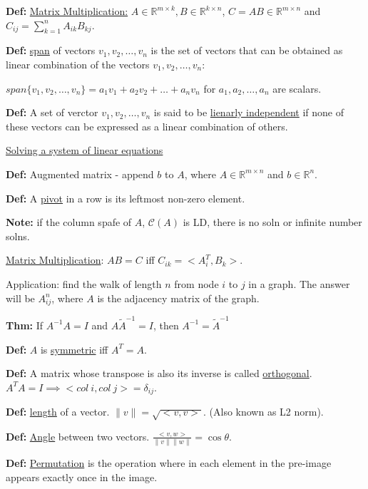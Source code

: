 \documentclass{report}
\begin{document}
\textbf{Def:} \underline{Matrix Multiplication:} $A \in \mathbb{R}^{m \times k}, B \in \mathbb{R}^{k \times n}$,
$C = AB \in \mathbb{R}^{m \times n}$ and $C_{ij} = \sum_{k=1}^{n} A_{ik}B_{kj}$.

\textbf{Def:} \underline{span} of vectors $v_1, v_2, \dots, v_n$ is the set of vectors that can be obtained as
linear combination of the vectors $v_1, v_2, \dots, v_n$:

$span\{v_1, v_2, \dots, v_n\} = a_1v_1 + a_2v_2 + \dots + a_nv_n$ for $a_1, a_2, \dots, a_n$ are scalars.

\textbf{Def:} A set of verctor $v_1, v_2, \dots, v_n$ is said to be \underline{lienarly
    independent} if none of these vectors can be expressed as a linear combination
of others.

\vspace{2mm}
\underline{Solving a system of linear equations}

\textbf{Def:} Augmented matrix - append $b$ to $A$, where $A \in
    \mathbb{R}^{m \times n}$ and $b \in \mathbb{R}^{n}$.

\textbf{Def:} A \underline{pivot} in a row is its leftmost non-zero element.

\textbf{Note:} if the column spafe of $A$, $\mathcal{C}(A)$ is LD,
there is no soln or infinite number solns.

\underline{Matrix Multiplication}: $AB = C$ iff $C_{ik} = <A_i^T, B_k>$.

Application: find the walk of length $n$ from node $i$ to $j$ in a graph.
The answer will be $A^{n}_{ij}$, where $A$ is the adjacency matrix of
the graph.

\textbf{Thm:} If $A^{-1}A = I$ and $A\tilde{A}^{-1} = I$, then $A^{-1}
    = \tilde{A}^{-1}$

\textbf{Def:} $A$ is \underline{symmetric} iff $A^{T} = A$.

\textbf{Def:} A matrix whose transpose is also its inverse is
called \underline{orthogonal}. $A^{T}A = I \implies <col\ i, col\ j> =
    \delta_{ij}$.

\textbf{Def:} \underline{length} of a vector.
$\|v\| = \sqrt{<v, v>}$. (Also known as L2 norm).

\textbf{Def:} \underline{Angle} between two vectors.
$\frac{<v, w>}{\|v\| \|w\|} = \cos \theta$.

\vspace{2mm}

\textbf{Def:} \underline{Permutation} is the operation where in each
element in the pre-image appears exactly once in the image.
\end{document}
